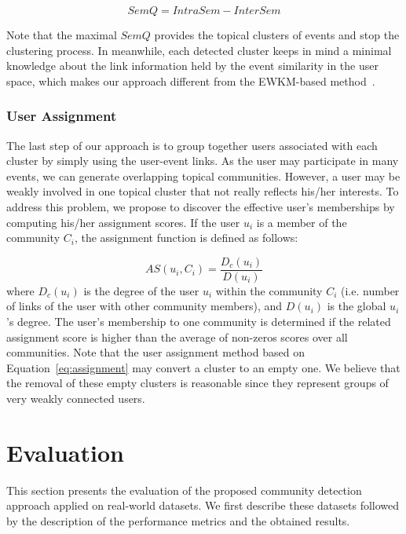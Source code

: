  \begin{equation} \label{eq:quality}
		SemQ=IntraSem-InterSem
\end{equation}

Note that the maximal $SemQ$ provides the topical clusters of events and stop the clustering process. In meanwhile, each detected cluster keeps in mind a minimal knowledge about the link information held by the event similarity in the user space, which makes our approach different from the EWKM-based method~\cite{Zhongying:12}. 

\subsubsection{User Assignment}   \label{sec:assignment}
The last step of our approach is to group together users associated with each cluster by simply using the user-event links.  As the user may participate in many events, we can generate overlapping topical communities. However, a user may be weakly involved in one topical cluster that not really reflects his/her interests. To address this problem, we propose to discover the effective user's memberships by computing his/her assignment scores. If the user $u_i$ is a member of the community $C_i$, the assignment function is defined as follows:

\begin{equation}    \label{eq:assignment}
			AS(u_i,C_i)=\frac{D_c(u_i)}{D(u_i)}				
\end{equation}
where $D_c(u_i)$ is the degree of the user $u_i$ within the community $C_i$ (i.e. number of links of the user with other community members), and $D(u_i)$ is the global $u_i$'s degree. The user's membership to one community is determined if the related assignment score is higher than the average of non-zeros scores over all communities. Note that the user assignment method based on Equation~\ref{eq:assignment} may convert a cluster to an empty one. We believe that the removal of these empty clusters is reasonable since they represent groups of very weakly connected users.

\section{Evaluation}   \label{sec:experiments}
This section presents the evaluation of the proposed community detection approach applied on real-world datasets. We first describe these datasets  followed by the description of the performance metrics and the obtained results.

